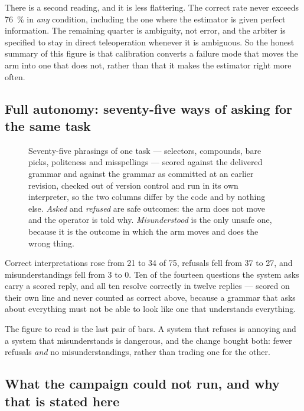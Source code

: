 There is a second reading, and it is less flattering. The correct rate never
exceeds \SI{76}{\percent} in \emph{any} condition, including the one where
the estimator is given perfect information. The remaining quarter is
ambiguity, not error, and the arbiter is specified to stay in direct
teleoperation whenever it is ambiguous. So the honest summary of this figure
is that calibration converts a failure mode that moves the arm into one that
does not, rather than that it makes the estimator right more often.

\subsection{Full autonomy: seventy-five ways of asking for the same task}
\label{sec:sim-language}

\begin{figure}[htbp]
  \centering
  
  \caption[Instruction handling, before and after]{Seventy-five phrasings of
  one task --- selectors, compounds, bare picks, politeness and misspellings
  --- scored against the delivered grammar and against the grammar as
  committed at an earlier revision, checked out of version control and run in
  its own interpreter, so the two columns differ by the code and by nothing
  else. \emph{Asked} and \emph{refused} are safe outcomes: the arm does not
  move and the operator is told why. \emph{Misunderstood} is the only unsafe
  one, because it is the outcome in which the arm moves and does the wrong
  thing.}
  \label{fig:sim-instructions}
\end{figure}

Correct interpretations rose from \num{21} to \num{34} of \num{75}, refusals
fell from \num{37} to \num{27}, and misunderstandings fell from \num{3} to
\num{0}. Ten of the fourteen questions the system asks carry a scored reply,
and all ten resolve correctly in twelve replies --- scored on their own line
and never counted as correct above, because a grammar that asks about
everything must not be able to look like one that understands everything.

The figure to read is the last pair of bars. A system that refuses is
annoying and a system that misunderstands is dangerous, and the change bought
both: fewer refusals \emph{and} no misunderstandings, rather than trading one
for the other.

\subsection{What the campaign could not run, and why that is stated here}

